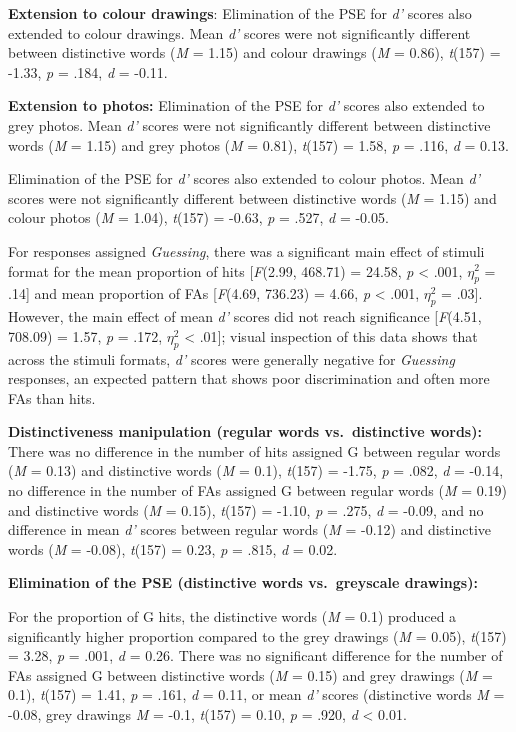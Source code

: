\documentclass[
  11pt,
]{article}
\begin{document}
\textbf{Extension to colour drawings}: Elimination of the PSE for
\emph{d'} scores also extended to colour drawings. Mean \emph{d'} scores
were not significantly different between distinctive words (\emph{M} =
1.15) and colour drawings (\emph{M} = 0.86), \emph{t}(157) = -1.33,
\emph{p} = .184, \emph{d} = -0.11.

\textbf{Extension to photos:} Elimination of the PSE for \emph{d'}
scores also extended to grey photos. Mean \emph{d'} scores were not
significantly different between distinctive words (\emph{M} = 1.15) and
grey photos (\emph{M} = 0.81), \emph{t}(157) = 1.58, \emph{p} = .116,
\emph{d} = 0.13.

Elimination of the PSE for \emph{d'} scores also extended to colour
photos. Mean \emph{d'} scores were not significantly different between
distinctive words (\emph{M} = 1.15) and colour photos (\emph{M} = 1.04),
\emph{t}(157) = -0.63, \emph{p} = .527, \emph{d} = -0.05.

\newpage

For responses assigned \emph{Guessing}, there was a significant main
effect of stimuli format for the mean proportion of hits
{[}\emph{F}(2.99, 468.71) = 24.58, \emph{p} \textless{} .001,
\(\eta^2_p\) = .14{]} and mean proportion of FAs {[}\emph{F}(4.69,
736.23) = 4.66, \emph{p} \textless{} .001, \(\eta^2_p\) = .03{]}.
However, the main effect of mean \emph{d'} scores did not reach
significance {[}\emph{F}(4.51, 708.09) = 1.57, \emph{p} = .172,
\(\eta^2_p\) \textless{} .01{]}; visual inspection of this data shows
that across the stimuli formats, \emph{d'} scores were generally
negative for \emph{Guessing} responses, an expected pattern that shows
poor discrimination and often more FAs than hits.

\textbf{Distinctiveness manipulation (regular words vs.~distinctive
words):} There was no difference in the number of hits assigned G
between regular words (\emph{M} = 0.13) and distinctive words (\emph{M}
= 0.1), \emph{t}(157) = -1.75, \emph{p} = .082, \emph{d} = -0.14, no
difference in the number of FAs assigned G between regular words
(\emph{M} = 0.19) and distinctive words (\emph{M} = 0.15), \emph{t}(157)
= -1.10, \emph{p} = .275, \emph{d} = -0.09, and no difference in mean
\emph{d'} scores between regular words (\emph{M} = -0.12) and
distinctive words (\emph{M} = -0.08), \emph{t}(157) = 0.23, \emph{p} =
.815, \emph{d} = 0.02.

\textbf{Elimination of the PSE (distinctive words vs.~greyscale
drawings):}

For the proportion of G hits, the distinctive words (\emph{M} = 0.1)
produced a significantly higher proportion compared to the grey drawings
(\emph{M} = 0.05), \emph{t}(157) = 3.28, \emph{p} = .001, \emph{d} =
0.26. There was no significant difference for the number of FAs assigned
G between distinctive words (\emph{M} = 0.15) and grey drawings
(\emph{M} = 0.1), \emph{t}(157) = 1.41, \emph{p} = .161, \emph{d} =
0.11, or mean \emph{d'} scores (distinctive words \emph{M} = -0.08, grey
drawings \emph{M} = -0.1, \emph{t}(157) = 0.10, \emph{p} = .920,
\emph{d} \textless{} 0.01.
\end{document}
